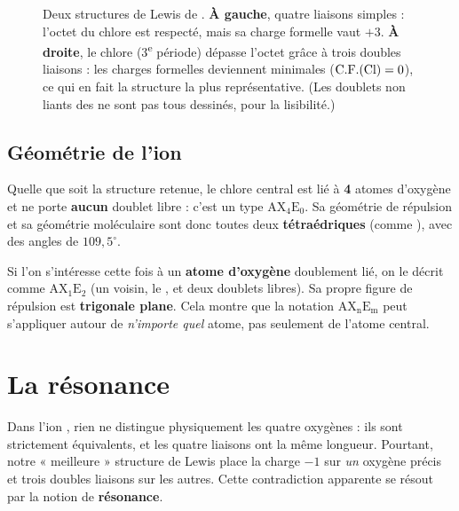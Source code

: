 \documentclass[11pt,a4paper]{article}
\newcommand{\CF}{\ensuremath{\mathrm{C.F.}}}
\newcommand{\AX}[2]{\ensuremath{\mathrm{AX_{#1}E_{#2}}}}
\begin{document}
\begin{figure}[h]
\caption{Deux structures de Lewis de . \textbf{À gauche}, quatre liaisons simples :
l'octet du chlore est respecté, mais sa charge formelle vaut $+3$. \textbf{À droite}, le chlore
(3\textsuperscript{e} période) dépasse l'octet grâce à trois doubles liaisons : les charges
formelles deviennent minimales ($\CF(\ce{Cl})=0$), ce qui en fait la structure la plus
représentative. (Les doublets non liants des  ne sont pas tous dessinés, pour la
lisibilité.)}
\label{fig:perchlorate}
\end{figure}

\subsection{Géométrie de l'ion}

Quelle que soit la structure retenue, le chlore central est lié à \textbf{4} atomes d'oxygène et
ne porte \textbf{aucun} doublet libre : c'est un type \AX{4}{0}. Sa géométrie de répulsion et sa
géométrie moléculaire sont donc toutes deux \textbf{tétraédriques} (comme ), avec des
angles  de $109{,}5^\circ$.

\begin{remarque}
Si l'on s'intéresse cette fois à un \textbf{atome d'oxygène} doublement lié, on le décrit comme
\AX{1}{2} (un voisin, le , et deux doublets libres). Sa propre figure de répulsion est
\textbf{trigonale plane}. Cela montre que la notation \AX{n}{m} peut s'appliquer autour de
\emph{n'importe quel} atome, pas seulement de l'atome central.
\end{remarque}

\section{La résonance}
\label{sec:resonance}

Dans l'ion , rien ne distingue physiquement les quatre oxygènes : ils sont strictement
équivalents, et les quatre liaisons  ont la même longueur. Pourtant, notre « meilleure »
structure de Lewis place la charge $-1$ sur \emph{un} oxygène précis et trois doubles liaisons sur
les autres. Cette contradiction apparente se résout par la notion de \textbf{résonance}.
\end{document}
